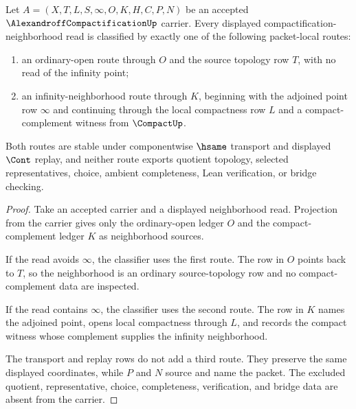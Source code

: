 \begin{theorem}
\label{thm:alexandroff-compactification-neighborhood-classifier}
Let $A=(X,T,L,S,\infty,O,K,H,C,P,N)$ be an accepted $\AlexandroffCompactificationUp$ carrier. Every displayed compactification-neighborhood read is classified by exactly one of the following packet-local routes:
\begin{enumerate}
\item an ordinary-open route through $O$ and the source topology row $T$, with no read of the infinity point;
\item an infinity-neighborhood route through $K$, beginning with the adjoined point row $\infty$ and continuing through the local compactness row $L$ and a compact-complement witness from $\CompactUp$.
\end{enumerate}
Both routes are stable under componentwise $\hsame$ transport and displayed $\Cont$ replay, and neither route exports quotient topology, selected representatives, choice, ambient completeness, Lean verification, or bridge checking.
\end{theorem}
\begin{proof}
Take an accepted carrier and a displayed neighborhood read. Projection from the carrier gives only the ordinary-open ledger $O$ and the compact-complement ledger $K$ as neighborhood sources.

If the read avoids $\infty$, the classifier uses the first route. The row in $O$ points back to $T$, so the neighborhood is an ordinary source-topology row and no compact-complement data are inspected.

If the read contains $\infty$, the classifier uses the second route. The row in $K$ names the adjoined point, opens local compactness through $L$, and records the compact witness whose complement supplies the infinity neighborhood.

The transport and replay rows do not add a third route. They preserve the same displayed coordinates, while $P$ and $N$ source and name the packet. The excluded quotient, representative, choice, completeness, verification, and bridge data are absent from the carrier.
\end{proof}

